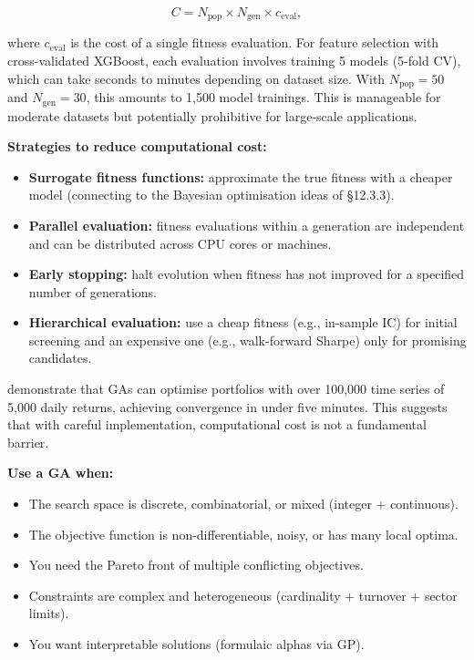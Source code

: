 \begin{equation}
C = N_{\text{pop}} \times N_{\text{gen}} \times c_{\text{eval}}, \tag{11.7}
\end{equation}

where $c_{\text{eval}}$ is the cost of a single fitness evaluation. For feature selection with cross-validated XGBoost, each evaluation involves training 5 models (5-fold CV), which can take seconds to minutes depending on dataset size. With $N_{\text{pop}} = 50$ and $N_{\text{gen}} = 30$, this amounts to 1,500 model trainings. This is manageable for moderate datasets but potentially prohibitive for large-scale applications.

\textbf{Strategies to reduce computational cost:}

\begin{itemize}
\item \textbf{Surrogate fitness functions:} approximate the true fitness with a cheaper model (connecting to the Bayesian optimisation ideas of §12.3.3).
\item \textbf{Parallel evaluation:} fitness evaluations within a generation are independent and can be distributed across CPU cores or machines.
\item \textbf{Early stopping:} halt evolution when fitness has not improved for a specified number of generations.
\item \textbf{Hierarchical evaluation:} use a cheap fitness (e.g., in-sample IC) for initial screening and an expensive one (e.g., walk-forward Sharpe) only for promising candidates.
\end{itemize}

\cite{Huber2019} demonstrate that GAs can optimise portfolios with over 100,000 time series of 5,000 daily returns, achieving convergence in under five minutes. This suggests that with careful implementation, computational cost is not a fundamental barrier.

\textbf{Use a GA when:}

\begin{itemize}
\item The search space is discrete, combinatorial, or mixed (integer + continuous).
\item The objective function is non-differentiable, noisy, or has many local optima.
\item You need the Pareto front of multiple conflicting objectives.
\item Constraints are complex and heterogeneous (cardinality + turnover + sector limits).
\item You want interpretable solutions (formulaic alphas via GP).
\end{itemize}

